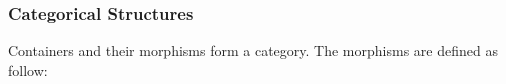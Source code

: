 \begin{code}%
\>[0]\AgdaSpace{}%
\AgdaSpace{}%
\AgdaSymbol{:}\AgdaSpace{}%
\AgdaSpace{}%
\AgdaSpace{}%
\AgdaSpace{}%
\<%
\\
\>[0][@{}l@{\AgdaIndent{0}}]%
\>[2]\AgdaSpace{}%
\AgdaSymbol{:}\AgdaSpace{}%
\AgdaSpace{}%
\AgdaSymbol{(}\AgdaSpace{}%
\AgdaSymbol{)}\<%
\\
%
\>[2]%
\>[7]\AgdaSymbol{:}\AgdaSpace{}%
\AgdaSpace{}%
\AgdaSymbol{\{}\AgdaSymbol{\}}\AgdaSpace{}%
\AgdaSpace{}%
\AgdaSpace{}%
\AgdaSpace{}%
\AgdaSpace{}%
\AgdaSpace{}%
\AgdaSymbol{(}\AgdaSpace{}%
\AgdaSymbol{)}\<%
\\
%
\\[\AgdaEmptyExtraSkip]%
\>[0]\AgdaSpace{}%
\AgdaSymbol{:}\AgdaSpace{}%
\<%
\\
\>[0]\AgdaSpace{}%
\AgdaSymbol{=}\AgdaSpace{}%
\AgdaSpace{}%
\AgdaSpace{}%
\<%
\end{code}

\subsubsection*{Categorical Structures}

Containers and their morphisms form a category. The morphisms are defined as follow:

